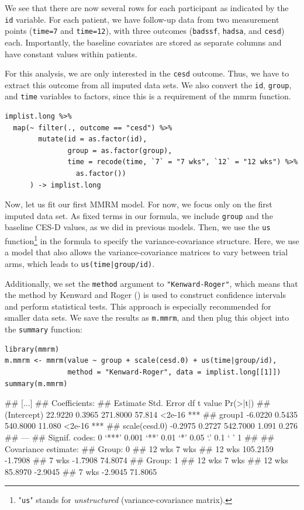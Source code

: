 We see that there are now several rows for each participant as indicated by the \texttt{id} variable. For each patient, we have follow-up data from two measurement points (\texttt{time=7} and \texttt{time=12}), with three outcomes (\texttt{badssf}, \texttt{hadsa}, and \texttt{cesd}) each. Importantly, the baseline covariates are stored as separate columns and have constant values within patients.

For this analysis, we are only interested in the \texttt{cesd} outcome. Thus, we have to extract this outcome from all imputed data sets. We also convert the \texttt{id}, \texttt{group}, and \texttt{time} variables to factors, since this is a requirement of the \textsf{mmrm} function.

\begin{lstlisting}
implist.long %>% 
  map(~ filter(., outcome == "cesd") %>%
        mutate(id = as.factor(id),
               group = as.factor(group),
               time = recode(time, `7` = "7 wks", `12` = "12 wks") %>% 
                 as.factor())
      ) -> implist.long
\end{lstlisting}

Now, let us fit our first MMRM model. For now, we focus only on the first imputed data set. As fixed terms in our formula, we include \texttt{group} and the baseline CES-D values, as we did in previous models. Then, we use the \texttt{us} function\footnote{"\texttt{us}" stands for \emph{unstructured} (variance-covariance matrix).} in the formula to specify the variance-covariance structure. Here, we use a model that also allows the variance-covariance matrices to vary between trial arms, which leads to \texttt{us(time|group/id)}. 

Additionally, we set the \texttt{method} argument to \texttt{"Kenward-Roger"}, which means that the method by Kenward and Roger (\citeyear{kenward1997small}) is used to construct confidence intervals and perform statistical tests. This approach is especially recommended for smaller data sets. We save the results as \texttt{m.mmrm}, and then plug this object into the \texttt{summary} function:

\begin{lstlisting}
library(mmrm)
m.mmrm <- mmrm(value ~ group + scale(cesd.0) + us(time|group/id), 
               method = "Kenward-Roger", data = implist.long[[1]])
summary(m.mmrm)
\end{lstlisting}

\begin{example}
## [...]
## Coefficients: 
##               Estimate Std. Error       df t value Pr(>|t|)    
## (Intercept)    22.9220     0.3965 271.8000  57.814   <2e-16 ***
## group1         -6.0220     0.5435 540.8000  11.080   <2e-16 ***
## scale(cesd.0)  -0.2975     0.2727 542.7000   1.091    0.276    
## ---
## Signif. codes:  0 ‘***’ 0.001 ‘**’ 0.01 ‘*’ 0.05 ‘.’ 0.1 ‘ ’ 1
## 
## Covariance estimate:
## Group: 0
##          12 wks   7 wks
## 12 wks 105.2159 -1.7908
## 7 wks   -1.7908 74.8074
## Group: 1
##         12 wks   7 wks
## 12 wks 85.8970 -2.9045
## 7 wks  -2.9045 71.8065
\end{example}

